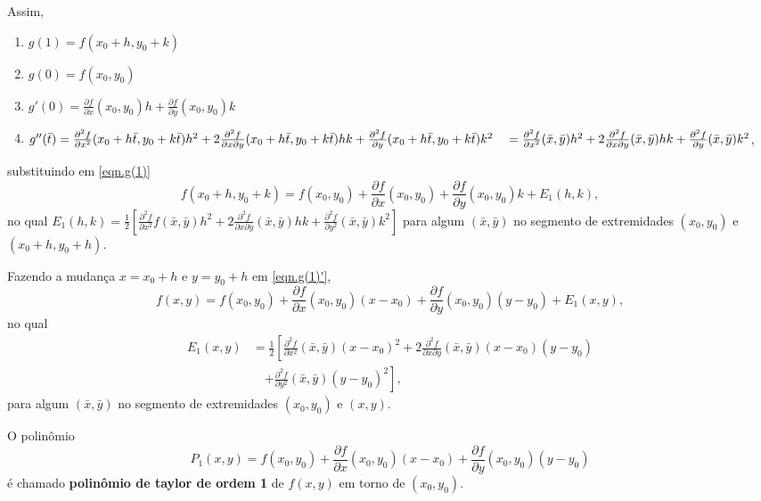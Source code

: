 Assim,
    \begin{enumerate}
        \item \(g(1) = f(x_0 + h, y_0 + k)\)
        \item \(g(0) = f(x_0,y_0)\)
        \item \(g'(0) = \frac{\partial f}{\partial x}(x_0,y_0) h + \frac{\partial f}{\partial y}(x_0,y_0)k\)
        \item \(g''(\bar{t}) = \frac{\partial^2 f} {\partial x^2}(x_0+h\bar{t}, y_0 + k\bar{t}) h^2 + 2\frac{\partial^2 f}{\partial x \partial y} (x_0 + h\bar{t}, y_0 + k\bar{t}) hk + \frac{\partial^2 f}{\partial y}(x_0+h\bar{t},y_0+k\bar{t}) k^2 \\ \quad = \frac{\partial^2 f} {\partial x^2}(\bar{x},\bar{y}) h^2 + 2\frac{\partial^2 f}{\partial x \partial y} (\bar{x},\bar{y}) hk + \frac{\partial^2 f}{\partial y}(\bar{x},\bar{y}) k^2\),
    \end{enumerate}
substituindo em \eqref{eqn.g(1)}
    \begin{equation}\label{eqn.g(1)'}
        f(x_0+h,y_0+k) = f(x_0,y_0) + \frac{\partial f}{\partial x}(x_0,y_0) + \frac{\partial f}{\partial y}(x_0,y_0)k + E_1(h,k),
    \end{equation}
no qual \(E_1(h,k) = \frac{1}{2}\left[ \frac{\partial^2 f}{\partial x^2}f(\bar{x},\bar{y}) h^2 + 2\frac{\partial^2 f}{\partial x \partial y} (\bar{x},\bar{y}) hk + \frac{\partial^2 f}{\partial y^2}(\bar{x},\bar{y})k^2  \right]\) para algum \((\bar{x},\bar{y})\) no segmento de extremidades \((x_0,y_0)\) e \((x_0+h,y_0+h)\).

Fazendo a mudança \(x = x_0+h\) e \(y = y_0+h\) em \eqref{eqn.g(1)'}, \[f(x,y) = f(x_0,y_0) + \frac{\partial f}{\partial x}(x_0,y_0)(x-x_0) + \frac{\partial f}{\partial y}(x_0,y_0)(y-y_0) + E_1(x,y),\] no qual
    \begin{align*}
        E_1(x,y) 
            & = \frac{1}{2}\left[ \frac{\partial^2 f}{\partial x^2}(\bar{x},\bar{y})(x-x_0)^2 + 2\frac{\partial^2 f}{\partial x \partial y}(\bar{x},\bar{y})(x-x_0)(y-y_0) \right.\\
            & \quad \left. + \frac{\partial^2 f}{\partial y^2}(\bar{x},\bar{y})(y-y_0)^2 \right],
    \end{align*}
para algum \((\bar{x},\bar{y})\) no segmento de extremidades \((x_0,y_0)\) e \((x,y)\).

O polinômio \[P_1(x,y) = f(x_0,y_0) + \frac{\partial f}{\partial x}(x_0,y_0)(x-x_0) + \frac{\partial f}{\partial y}(x_0,y_0)(y-y_0)\] é chamado \textbf{polinômio de taylor de ordem 1} de \(f(x,y)\) em torno de \((x_0,y_0)\).

